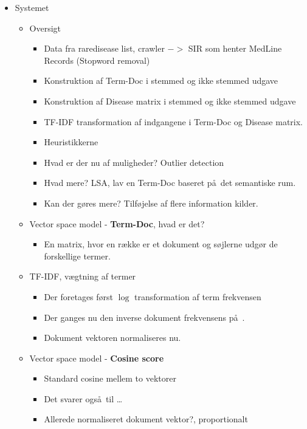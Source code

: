\documentclass[a4paper, 10pt, english, final]{report}
\begin{document}
\begin{itemize}

  \item Systemet
    \begin{itemize}
      \item Oversigt
        \begin{itemize}
          \item Data fra raredisease list, crawler $->$ SIR som henter MedLine Records (Stopword removal)
          \item Konstruktion af Term-Doc i stemmed og ikke stemmed udgave
          \item Konstruktion af Disease matrix i stemmed og ikke stemmed udgave
          \item TF-IDF transformation af indgangene i Term-Doc og Disease matrix.
          \item Heuristikkerne
          \item Hvad er der nu af muligheder? Outlier detection
          \item Hvad mere? LSA, lav en Term-Doc baseret p\aa\ det semantiske rum.
          \item Kan der g\o res mere? Tilf\o jelse af flere information kilder.
        \end{itemize}
      \item Vector space model - \textbf{Term-Doc}, hvad er det?
        \begin{itemize}
          \item En matrix, hvor en r\ae kke er et dokument og s\o jlerne udg\o r de forskellige termer.
        \end{itemize}
      \item TF-IDF, v\ae gtning af termer
        \begin{itemize}
          \item Der foretages f\o rst $\log$ transformation af term frekvensen
          \item Der ganges nu den inverse dokument frekvensens p\aa\ .
          \item Dokument vektoren normaliseres nu.
        \end{itemize}
      \item Vector space model - \textbf{Cosine score}
        \begin{itemize}
          \item Standard cosine mellem to vektorer
          \item Det svarer ogs\aa\ til \ldots
          \item Allerede normaliseret dokument vektor?, proportionalt

\end{itemize}
\end{itemize}
\end{itemize}
\end{document}
